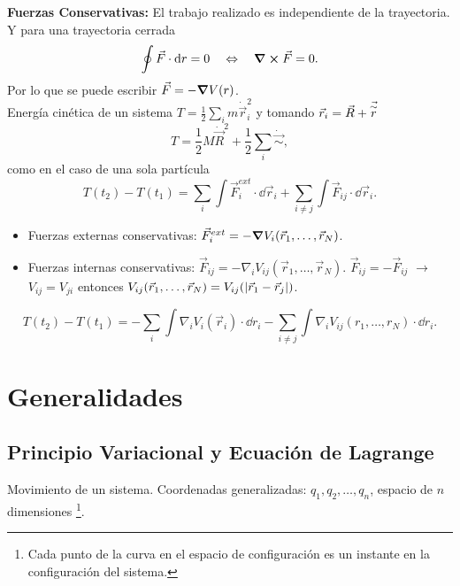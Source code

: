\textbf{Fuerzas Conservativas:} El trabajo realizado es independiente de la trayectoria. Y para una trayectoria cerrada
\begin{equation*}
	\oint \vec{F} \cdot \dd{r} = 0 \quad \Leftrightarrow \quad \curl{\vec{F}} = 0.
\end{equation*}
Por lo que se puede escribir $\vec{F} = -\grad{V(r)}$. \\

Energía cinética de un sistema $T = \frac{1}{2} \sum _i m \dot{\vec{r}}_i ^2$ y tomando $\vec{r} _i = \vec{R} + \vec{\overset{\sim}{r}}$
\begin{equation}
	T = \frac{1}{2} M \dot{\vec{R}}^2 + \frac{1}{2} \sum _i \dot{\vec{\sim}},
\end{equation}
como en el caso de una sola partícula
\begin{equation}
	T(t_2) - T(t_1) = \sum _i \int \vec{F} _i ^{ext} \cdot \dd{\vec{r}_i} + \sum_{i\neq j} \int \vec{F} _{ij} \cdot \dd{\vec{r}_i}.
\end{equation}

\begin{itemize}
	\item Fuerzas externas conservativas: $\vec{F} _i ^{ext} = -\grad{V_i} \qty(\vec{r}_1, \ldots ,\vec{r}_N)$.
	\item Fuerzas internas conservativas: $\vec{F}_{ij} = -\nabla _i V_{ij} (\vec{r}_1 ,\ldots ,\vec{r}_N)$. $\vec{F} _{ij} = -\vec{F}_{ij}$ $\to$ $V_{ij} = V_{ji}$ entonces $V_{ij} (\vec{r}_1 ,\ldots ,\vec{r}_N) = V_{ij} (\abs{\vec{r}_1 - \vec{r}_j})$.  
\end{itemize}

\begin{equation}
	T(t_2) - T(t_1) = -\sum _i \int \nabla _i V_i (\vec{r}_i) \cdot \dd{r}_i - \sum _{i\neq j} \int \nabla _i V_{ij} (r_1 ,\ldots, r_N) \cdot \dd{r}_i.
\end{equation}


\section{Generalidades}
\subsection{Principio Variacional y Ecuación de Lagrange}
Movimiento de un sistema. Coordenadas generalizadas: $q_1 ,q_2, \ldots, q_n$, espacio de $n$ dimensiones \footnote{Cada punto de la curva en el espacio de configuración es un instante en la configuración del sistema.}. 

